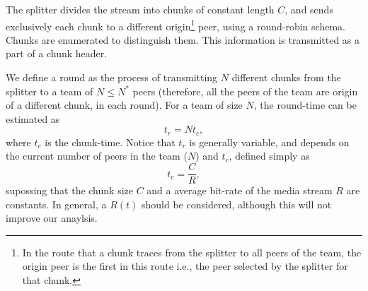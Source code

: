 

\label{sec:feeding_the_team}

The splitter divides the stream into chunks of constant length $C$,
and sends exclusively each chunk to a different
\gls{origin}\footnote{In the route that a chunk traces from the
  splitter to all peers of the team, the origin peer is the first in
  this route i.e., the peer selected by the splitter for that chunk.}
peer, using a round-robin schema. Chunks are enumerated to distinguish
them. This information is transmitted as a part of a chunk header.

\begin{comment}
More details about the implementation
are available in Fig.~\ref{fig:chunk_generation}.


\begin{figure*}
  \fig{500}{5cm}{DBS_splitter_feed} \caption{Chunk
    generation at the splitter and their transmission to the
    team.\label{fig:chunk_generation}}
\end{figure*}
\end{comment}

We define a \gls{round} as the process of transmitting $N$ different
chunks from the splitter to a team of $N\leq N^*$ peers (therefore,
all the peers of the team are origin of a different chunk, in each
round). For a team of size $N$, the \gls{round-time} can be estimated
as
\begin{equation}
  t_r=Nt_c,
\end{equation}
where $t_c$ is the \gls{chunk-time}.  Notice that $t_r$ is generally
variable, and depends on the current number of peers in the team
($N$) and $t_c$, defined simply as
\begin{equation}
  \label{eq:chunk_time}
  t_c=\frac{C}{R},
\end{equation}
supossing that the chunk size $C$ and a average bit-rate of the media
stream $R$ are constants. In general, a $R(t)$ should be considered,
although this will not improve our anaylsis.

\begin{comment}
(in a team) as the time necessary to send two consecutive chunks from
  the splitter (of such team) to the same peer, using the
  round-robing. This time is variable and depends on $|T|$, $C$, and
  the average bit-rate of the media, $A$.
\end{comment}

